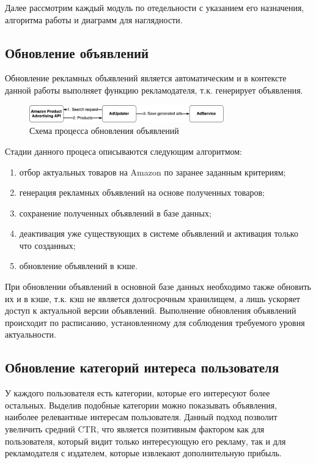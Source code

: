 \documentclass[specification,annotation,times]{itmo-student-thesis}
\begin{document}
Далее рассмотрим каждый модуль по отедельности с указанием его назначения, алгоритма работы и диаграмм для наглядности.

\subsection{Обновление объявлений}

Обновление рекламных объявлений является автоматическим и в контексте данной работы выполняет функцию рекламодателя, т.к. генерирует объявления. 

\begin{figure}[h]
\caption{Схема процесса обновления объявлений}
\includegraphics[width=0.75\textwidth]{ad-updater}
\centering
\end{figure}
Стадии данного процеса описываются следующим алгоритмом:
\begin{enumerate}
\item отбор актуальных товаров на Amazon по заранее заданным критериям;
\item генерация рекламных объявлений на основе полученных товаров;
\item сохранение полученных объявлений в базе данных;
\item деактивация уже существующих в системе объявлений и активация только что созданных;
\item обновление объявлений в кэше.
\end{enumerate}

При обновлении объявлений в основной базе данных необходимо также обновить их и в кэше, т.к. кэш не является долгосрочным хранилищем, а лишь ускоряет доступ к актуальной версии объявлений. Выполнение обновления объявлений происходит по расписанию, установленному для соблюдения требуемого уровня актуальности.

\subsection{Обновление категорий интереса пользователя}

У каждого пользователя есть категории, которые его интересуют более остальных. Выделив подобные категории можно показывать объявления, наиболее релевантные интересам пользователя. Данный подход позволит увеличить средний CTR, что является позитивным фактором как для пользователя, который видит только интересующую его рекламу, так и для рекламодателя с издателем, которые извлекают дополнительную прибыль.
 
\end{document}
